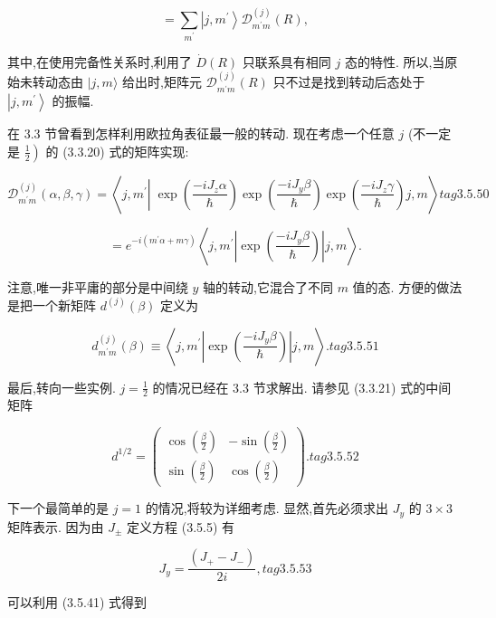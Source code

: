 $$
= \mathop{\sum }\limits_{{m}^{\prime }}\left| {j,{m}^{\prime }}\right\rangle {\mathcal{D}}_{{m}^{\prime }m}^{\left( j\right) }\left( R\right) ,
$$

其中,在使用完备性关系时,利用了 $\dot{D}\left( R\right)$ 只联系具有相同 $j$ 态的特性. 所以,当原始未转动态由 $|j, m\rangle$ 给出时,矩阵元 ${\mathcal{D}}_{{m}^{\prime }m}^{\left( j\right) }\left( R\right)$ 只不过是找到转动后态处于 $\left| {j,{m}^{\prime }}\right\rangle$ 的振幅.

在 3.3 节曾看到怎样利用欧拉角表征最一般的转动. 现在考虑一个任意 $j$ (不一定是 $\left. \frac{1}{2}\right)$ 的 (3.3.20) 式的矩阵实现:

$$
{\mathcal{D}}_{{m}^{\prime }m}^{\left( j\right) }\left( {\alpha ,\beta ,\gamma }\right) = \left\langle {j,{m}^{\prime }\left| {\;\exp \left( \frac{-i{J}_{z}\alpha }{\hslash }\right) \exp \left( \frac{-i{J}_{y}\beta }{\hslash }\right) \exp \left( \frac{-i{J}_{z}\gamma }{\hslash }\right) }\right. j, m}\right\rangle tag{3. 5.50}
$$

$$
= {e}^{-i\left( {{m}^{\prime }\alpha + {m\gamma }}\right) }\left\langle {j,{m}^{\prime }\left| {\exp \left( \frac{-i{J}_{y}\beta }{\hslash }\right) }\right| j, m}\right\rangle .
$$

注意,唯一非平庸的部分是中间绕 $y$ 轴的转动,它混合了不同 $m$ 值的态. 方便的做法是把一个新矩阵 ${d}^{\left( j\right) }\left( \beta \right)$ 定义为

$$
{d}_{{m}^{\prime }m}^{\left( j\right) }\left( \beta \right) \equiv \left\langle {j,{m}^{\prime }\left| {\exp \left( \frac{-i{J}_{y}\beta }{\hslash }\right) }\right| j, m}\right\rangle . tag{3. 5.51}
$$

最后,转向一些实例. $j = \frac{1}{2}$ 的情况已经在 3.3 节求解出. 请参见 (3.3.21) 式的中间矩阵

$$
{d}^{1/2} = \left( \begin{matrix} \cos \left( \frac{\beta }{2}\right) & - \sin \left( \frac{\beta }{2}\right) \\ \sin \left( \frac{\beta }{2}\right) & \cos \left( \frac{\beta }{2}\right) \end{matrix}\right) . tag{3. 5.52}
$$

下一个最简单的是 $j = 1$ 的情况,将较为详细考虑. 显然,首先必须求出 ${J}_{y}$ 的 $3 \times 3$ 矩阵表示. 因为由 ${J}_{ \pm }$ 定义方程 (3.5.5) 有

$$
{J}_{y} = \frac{\left( {J}_{ + } - {J}_{ - }\right) }{2i}, tag{3. 5.53}
$$

可以利用 (3.5.41) 式得到

